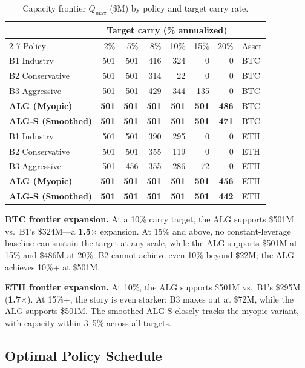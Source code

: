 \documentclass[11pt]{article}
\begin{document}
\begin{table}[htbp]
\centering
\caption{Capacity frontier $Q_{\max}$ (\$M) by policy and target carry rate.}
\label{tab:capacity}
\begin{tabular}{l*{6}{r}l}
\toprule
& \multicolumn{6}{c}{Target carry (\% annualized)} & \\
\cmidrule(lr){2-7}
Policy & 2\% & 5\% & 8\% & 10\% & 15\% & 20\% & Asset \\
\midrule
B1 Industry & 501 & 501 & 416 & 324 & 0 & 0 & BTC \\
B2 Conservative & 501 & 501 & 314 & 22 & 0 & 0 & BTC \\
B3 Aggressive & 501 & 501 & 429 & 344 & 135 & 0 & BTC \\
\textbf{ALG (Myopic)} & \textbf{501} & \textbf{501} & \textbf{501} & \textbf{501} & \textbf{501} & \textbf{486} & BTC \\
\textbf{ALG-S (Smoothed)} & \textbf{501} & \textbf{501} & \textbf{501} & \textbf{501} & \textbf{501} & \textbf{471} & BTC \\
\midrule
B1 Industry & 501 & 501 & 390 & 295 & 0 & 0 & ETH \\
B2 Conservative & 501 & 501 & 355 & 119 & 0 & 0 & ETH \\
B3 Aggressive & 501 & 456 & 355 & 286 & 72 & 0 & ETH \\
\textbf{ALG (Myopic)} & \textbf{501} & \textbf{501} & \textbf{501} & \textbf{501} & \textbf{501} & \textbf{456} & ETH \\
\textbf{ALG-S (Smoothed)} & \textbf{501} & \textbf{501} & \textbf{501} & \textbf{501} & \textbf{501} & \textbf{442} & ETH \\
\bottomrule
\end{tabular}
\end{table}

\textbf{BTC frontier expansion.} At a 10\% carry target, the ALG supports \$501M vs.\ B1's \$324M---a \textbf{1.5$\times$} expansion. At 15\% and above, no constant-leverage baseline can sustain the target at any scale, while the ALG supports \$501M at 15\% and \$486M at 20\%. B2 cannot achieve even 10\% beyond \$22M; the ALG achieves 10\%+ at \$501M.

\textbf{ETH frontier expansion.} At 10\%, the ALG supports \$501M vs.\ B1's \$295M (\textbf{1.7$\times$}). At 15\%+, the story is even starker: B3 maxes out at \$72M, while the ALG supports \$501M. The smoothed ALG-S closely tracks the myopic variant, with capacity within 3--5\% across all targets.

\subsection{Optimal Policy Schedule}
\end{document}
